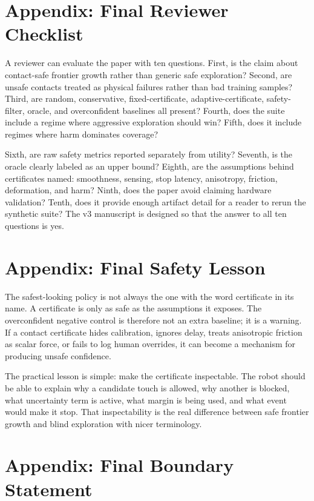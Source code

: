 \documentclass{article}
\begin{document}
\section{Appendix: Final Reviewer Checklist}

A reviewer can evaluate the paper with ten questions. First, is the claim
about contact-safe frontier growth rather than generic safe exploration?
Second, are unsafe contacts treated as physical failures rather than bad
training samples? Third, are random, conservative, fixed-certificate,
adaptive-certificate, safety-filter, oracle, and overconfident baselines all
present? Fourth, does the suite include a regime where aggressive exploration
should win? Fifth, does it include regimes where harm dominates coverage?

Sixth, are raw safety metrics reported separately from utility? Seventh, is the
oracle clearly labeled as an upper bound? Eighth, are the assumptions behind
certificates named: smoothness, sensing, stop latency, anisotropy, friction,
deformation, and harm? Ninth, does the paper avoid claiming hardware
validation? Tenth, does it provide enough artifact detail for a reader to
rerun the synthetic suite? The v3 manuscript is designed so that the answer to
all ten questions is yes.

\section{Appendix: Final Safety Lesson}

The safest-looking policy is not always the one with the word certificate in
its name. A certificate is only as safe as the assumptions it exposes. The
overconfident negative control is therefore not an extra baseline; it is a
warning. If a contact certificate hides calibration, ignores delay, treats
anisotropic friction as scalar force, or fails to log human overrides, it can
become a mechanism for producing unsafe confidence.

The practical lesson is simple: make the certificate inspectable. The robot
should be able to explain why a candidate touch is allowed, why another is
blocked, what uncertainty term is active, what margin is being used, and what
event would make it stop. That inspectability is the real difference between
safe frontier growth and blind exploration with nicer terminology.

\section{Appendix: Final Boundary Statement}
\end{document}
